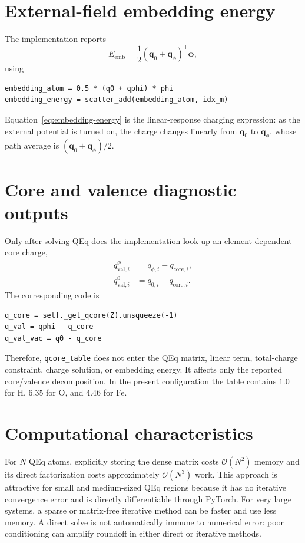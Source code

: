 \documentclass[11pt,a4paper]{article}
\newcommand{\vect}[1]{\bm{#1}}
\begin{document}
\section{External-field embedding energy}

The implementation reports
\begin{equation}
  E_{\mathrm{emb}}
  =\frac{1}{2}(\vect q_0+\vect q_\phi)^{\mathsf T}\vect\phi,
  \label{eq:embedding-energy}
\end{equation}
using
\begin{lstlisting}[style=pythonstyle]
embedding_atom = 0.5 * (q0 + qphi) * phi
embedding_energy = scatter_add(embedding_atom, idx_m)
\end{lstlisting}
Equation~\eqref{eq:embedding-energy} is the linear-response charging expression:
as the external potential is turned on, the charge changes linearly from
$\vect q_0$ to $\vect q_\phi$, whose path average is
$(\vect q_0+\vect q_\phi)/2$.

\section{Core and valence diagnostic outputs}

Only after solving QEq does the implementation look up an element-dependent
core charge,
\begin{align}
  q_{\mathrm{val},i}^{\phi}&=q_{\phi,i}-q_{\mathrm{core},i},\\
  q_{\mathrm{val},i}^{0}&=q_{0,i}-q_{\mathrm{core},i}.
\end{align}
The corresponding code is
\begin{lstlisting}[style=pythonstyle]
q_core = self._get_qcore(Z).unsqueeze(-1)
q_val = qphi - q_core
q_val_vac = q0 - q_core
\end{lstlisting}
Therefore, \texttt{qcore\_table} does not enter the QEq matrix, linear term,
total-charge constraint, charge solution, or embedding energy.  It affects only
the reported core/valence decomposition.  In the present configuration the
table contains $1.0$ for H, $6.35$ for O, and $4.46$ for Fe.

\section{Computational characteristics}

For $N$ QEq atoms, explicitly storing the dense matrix costs
$\mathcal O(N^2)$ memory and its direct factorization costs approximately
$\mathcal O(N^3)$ work.  This approach is attractive for small and medium-sized
QEq regions because it has no iterative convergence error and is directly
differentiable through PyTorch.  For very large systems, a sparse or
matrix-free iterative method can be faster and use less memory.  A direct solve
is not automatically immune to numerical error: poor conditioning can amplify
roundoff in either direct or iterative methods.
\end{document}
